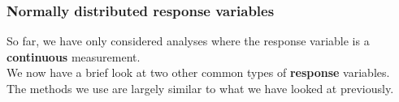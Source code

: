 \documentclass{beamer}\usepackage[]{graphicx}\usepackage[]{color}
\begin{document}
{{{%

\usebackgroundtemplate{}
\begin{frame}
\frametitle{Normally distributed response variables} 
So far, we have only considered analyses where the response variable is a {\bfseries continuous} measurement.\\ \vspace{0.3cm}
We now have a brief look at two other common types of {\bfseries response} variables.\\ \vspace{0.3cm}
The methods we use are largely similar to what we have looked at previously.
\end{frame}



}}}
\end{document}
